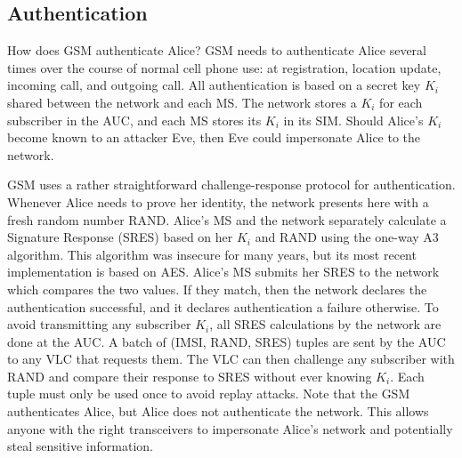 \documentclass[11pt]{article}
\begin{document}
\subsection{Authentication}
How does GSM authenticate Alice?
GSM needs to authenticate Alice several times over the course of normal cell phone use: at registration, location update, incoming call, and outgoing call. All authentication is based on a secret key $K_{i}$ shared between the network and each MS. The network stores a $K_{i}$ for each subscriber in the AUC, and each MS stores its $K_{i}$ in its SIM. Should Alice's $K_{i}$ become known to an attacker Eve, then Eve could impersonate Alice to the network. 

GSM uses a rather straightforward challenge-response protocol for authentication. Whenever Alice needs to prove her identity, the network presents here with a fresh random number RAND. Alice's MS and the network separately calculate a Signature Response (SRES) based on her $K_{i}$ and RAND using the one-way A3 algorithm. This algorithm was insecure for many years, but its most recent implementation is based on AES. Alice's MS submits her SRES to the network which compares the two values. If they match, then the network declares the authentication successful, and it declares authentication a failure otherwise. To avoid transmitting any subscriber $K_{i}$, all SRES calculations by the network are done at the AUC. A batch of (IMSI, RAND, SRES) tuples are sent by the AUC to any VLC that requests them. The VLC can then challenge any subscriber with RAND and compare their response to SRES without ever knowing $K_{i}$. Each tuple must only be used once to avoid replay attacks. Note that the GSM authenticates Alice, but Alice does not authenticate the network. This allows anyone with the right transceivers to impersonate Alice's network and potentially steal sensitive information.




\end{document}
